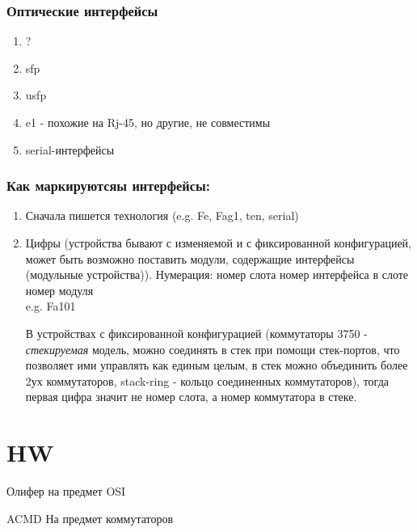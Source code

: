 \documentclass[a4paper,12pt]{article}
\begin{document}
\subsubsection{Оптические интерфейсы}
\begin{enumerate}
	\item ?
	\item sfp
	\item usfp
	\item e1 - похожие на Rj-45, но другие, не совместимы
	\item serial-интерфейсы
\end{enumerate}

\subsubsection{Как маркируютсяы интерфейсы:}
\begin{enumerate}
	\item Сначала пишется технология (e.g. Fe, Fag1, ten, serial)
	\item Цифры (устройства бывают с изменяемой и с фиксированной конфигурацией, может быть возможно поставить модули, содержащие интерфейсы (модульные устройства)). Нумерация:
	\subitem номер слота
	\subitem номер интерфейса в слоте
	\subitem номер модуля\\
	e.g. Fa101
	
	В устройствах с фиксированной конфигурацией (коммутаторы 3750 - \emph{стекируемая} модель, можно соединять в стек при помощи стек-портов, что позволяет ими управлять как единым целым, в стек можно объединить более 2ух коммутаторов, stack-ring - кольцо соединенных коммутаторов), тогда первая цифра значит не номер слота, а номер коммутатора в стеке.
	
\end{enumerate}

\section{HW}
Олифер на предмет OSI

ACMD На предмет коммутаторов
\end{document}
